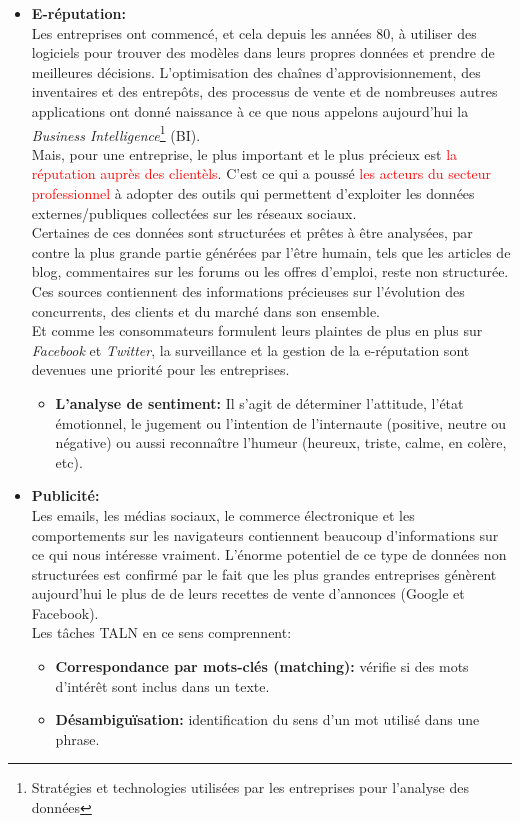 \begin{itemize}
    \item \textbf{E-réputation:}\\
    Les entreprises ont commencé, et cela depuis les années 80, à utiliser des logiciels pour trouver des modèles dans leurs propres données et prendre de meilleures décisions. L'optimisation des chaînes d'approvisionnement, des inventaires et des entrepôts, des processus de vente et de nombreuses autres applications ont donné naissance à ce que nous appelons aujourd'hui la \emph{Business Intelligence}\footnote{Stratégies et technologies utilisées par les entreprises pour l'analyse des données} (BI).\\ 
    Mais, pour une entreprise, le plus important et le plus précieux est \textcolor{red}{la réputation auprès des clientèls}. C'est ce qui a poussé \textcolor{red}{les acteurs du secteur professionnel} à adopter des outils qui permettent d'exploiter les données externes/publiques collectées sur les réseaux sociaux.\\
    Certaines de ces données sont structurées et prêtes à être analysées, par contre la plus grande partie générées par l'être humain, tels que les articles de blog, commentaires sur les forums ou les offres d'emploi, reste non structurée. Ces sources contiennent des informations précieuses sur l'évolution des concurrents, des clients et du marché dans son ensemble.\\
    Et comme les consommateurs formulent leurs plaintes de plus en plus sur \emph{Facebook} et \emph{Twitter}, la surveillance et la gestion de la e-réputation sont devenues une priorité pour les entreprises.
    \begin{itemize}
        \item \textbf{L'analyse de sentiment:} Il s'agit de déterminer l'attitude, l'état émotionnel, le jugement ou l'intention de l'internaute (positive, neutre ou négative) ou aussi reconnaître l'humeur (heureux, triste, calme, en colère, etc).\\
    \end{itemize}

    \item \textbf{Publicité:}\\
    Les emails, les médias sociaux, le commerce électronique et les comportements sur les navigateurs contiennent beaucoup d'informations sur ce qui nous intéresse vraiment. L'énorme potentiel de ce type de données non structurées est confirmé par le fait que les plus grandes entreprises génèrent aujourd'hui le plus de de leurs recettes de vente d'annonces (Google et Facebook).\\ Les tâches TALN en ce sens comprennent:
    \begin{itemize}
        \item \textbf{Correspondance par mots-clés (matching):} vérifie si des mots d'intérêt sont inclus dans un texte. 
        \item \textbf{Désambiguïsation:} identification du sens d'un mot utilisé dans une phrase.
    \end{itemize}
\end{itemize}

